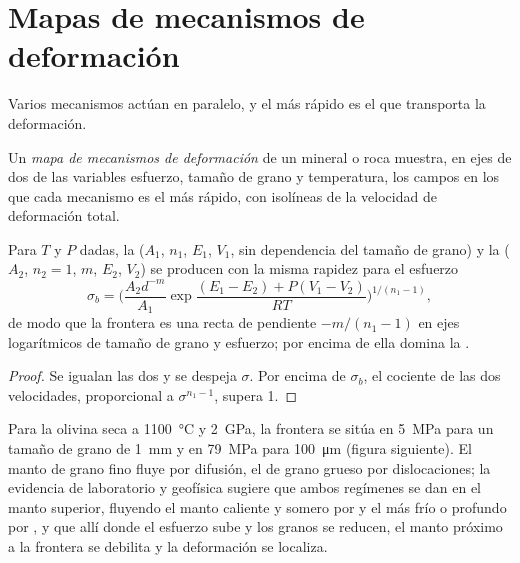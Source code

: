 \section{Mapas de mecanismos de deformación}

Varios mecanismos actúan en paralelo, y el más rápido es el que transporta la deformación.

\begin{definition}\label{def:b3:deformation-mechanisms:deformation-map}
Un \emph{mapa de mecanismos de deformación} de un
mineral o roca muestra, en ejes de dos de las variables esfuerzo, tamaño de grano y
temperatura, los campos en los que cada mecanismo es el más rápido, con isolíneas
de la velocidad de deformación total.
\end{definition}

\begin{proposition}\label{prop:b3:deformation-mechanisms:boundary}
Para $T$ y $P$ dadas, la  ($A_1$, $n_1$, $E_1$, $V_1$, sin
dependencia del tamaño de grano) y la  ($A_2$, $n_2 = 1$, $m$, $E_2$, $V_2$)
se producen con la misma rapidez para el esfuerzo
\[
  \sigma_b = \biggl(\frac{A_2d^{-m}}{A_1}
  \exp\frac{(E_1 - E_2) + P(V_1 - V_2)}{RT}\biggr)^{1/(n_1 - 1)} ,
\]
de modo que la frontera es una recta de pendiente $-m/(n_1 - 1)$ en ejes logarítmicos
de tamaño de grano y esfuerzo; por encima de ella domina la .
\end{proposition}

\begin{proof}
Se igualan las dos  y se despeja $\sigma$. Por encima de $\sigma_b$, el cociente de
las dos velocidades, proporcional a $\sigma^{n_1 - 1}$, supera 1.
\end{proof}

Para la olivina seca a \qty{1100}{\celsius} y \qty{2}{GPa}, la frontera se sitúa en
\qty{5}{MPa} para un tamaño de grano de \qty{1}{mm} y en \qty{79}{MPa} para
\qty{100}{\micro m} (figura siguiente). El manto de grano fino fluye por difusión,
el de grano grueso por dislocaciones; la evidencia de laboratorio y geofísica sugiere
que ambos regímenes se dan en el manto superior, fluyendo el manto caliente y somero por
 y el más frío o profundo por , y que allí donde
el esfuerzo sube y los granos se reducen, el manto próximo a la frontera se debilita
y la deformación se localiza.

